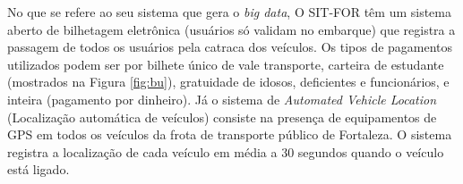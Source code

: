 \documentclass[        
    a4paper,          %
    12pt,             %
    chapter=TITLE,    %
    section=Title,    %
    subsection=Title, %
    oneside,          %
    english,          %
    spanish,          %
    brazil,           %
    fleqn             %
]{abntex2}
\begin{document}
  \begin{figure}[!h]
  \captionsetup{width=16cm}
  \centering
  \end{figure}
  
  No que se refere ao seu sistema que gera o \emph{big data}, O SIT-FOR têm um sistema aberto de bilhetagem eletrônica (usuários só validam no embarque) que registra a passagem de todos os usuários pela catraca dos veículos. Os tipos de pagamentos utilizados podem ser por bilhete único de vale transporte, carteira de estudante (mostrados na Figura \ref{fig:bu}), gratuidade de idosos, deficientes e funcionários, e inteira (pagamento por dinheiro). Já o sistema de \emph{Automated Vehicle Location} (Localização automática de veículos) consiste na presença de equipamentos de GPS em todos os veículos da frota de transporte público de Fortaleza. O sistema registra a localização de cada veículo em média a 30 segundos quando o veículo está ligado.
  
  \begin{figure}[!h]
  \captionsetup{width=16cm}
  \centering
  \end{figure}
  
\end{document}

